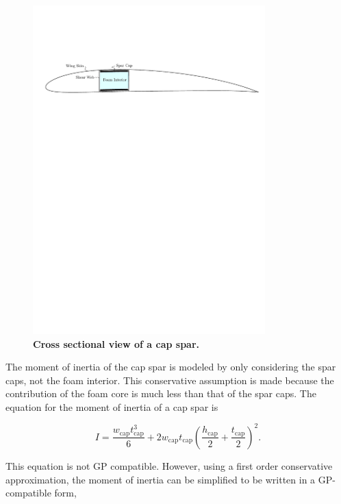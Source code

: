 \begin{figure}[H]
	\begin{center}
	\includegraphics[width=0.8\textwidth,natwidth=3242,natheight=1195]{capsparcross.pdf}
    \caption{\textbf{Cross sectional view of a cap spar.}}
	\label{f:capspar}
	\end{center}
\end{figure}

The moment of inertia of the cap spar is modeled by only considering the spar caps, not the foam interior.  
This conservative assumption is made because the contribution of the foam core is much less than that of the spar caps.  
The equation for the moment of inertia\cite{bending} of a cap spar is 

\begin{equation}
    \label{e:moispar}
    I = \frac{w_{\text{cap}}t_{\text{cap}}^3}{6} + 2w_{\text{cap}}t_{\text{cap}}\left( \frac{h_{\text{cap}}}{2} + \frac{t_{\text{cap}}}{2} \right)^2.
\end{equation}

This equation is not GP compatible.  However, using a first order conservative approximation, the moment of inertia can be simplified to be written in a GP-compatible form, 

